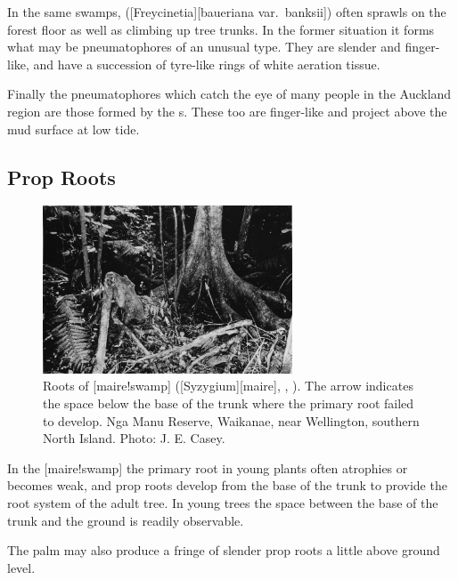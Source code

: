 In the same swamps,  ([Freycinetia][baueriana var.\ banksii]) often sprawls on the forest floor as well as climbing up tree trunks.
In the former situation it forms what may be pneumatophores of an unusual type.
They are slender and finger-like, and have a succession of tyre-like rings of white aeration tissue.

Finally the pneumatophores which catch the eye of many people in the Auckland region are those formed by the s.
These too are finger-like and project above the mud surface at low tide.

\subsection{Prop Roots}

\begin{figure}
	\includegraphics[width=0.66\textwidth]{graphics/figure14swampmaire.jpg}
	\centering
	\caption[Roots of swamp maire]{Roots of [maire!swamp] ([Syzygium][maire], , ).
	The arrow indicates the space below the base of the trunk where the primary root failed to develop.
	Nga Manu Reserve, Waikanae, near Wellington, southern North Island.
	Photo:  J. E. Casey.}%
	\label{fig:14swampmaire}
\end{figure}

In the [maire!swamp] the primary root in young plants often atrophies or becomes weak, and prop roots develop from the base of the trunk to provide the root system of the adult tree.
In young trees the space between the base of the trunk and the ground is readily observable.

The  palm may also produce a fringe of slender prop roots a little above ground level.

